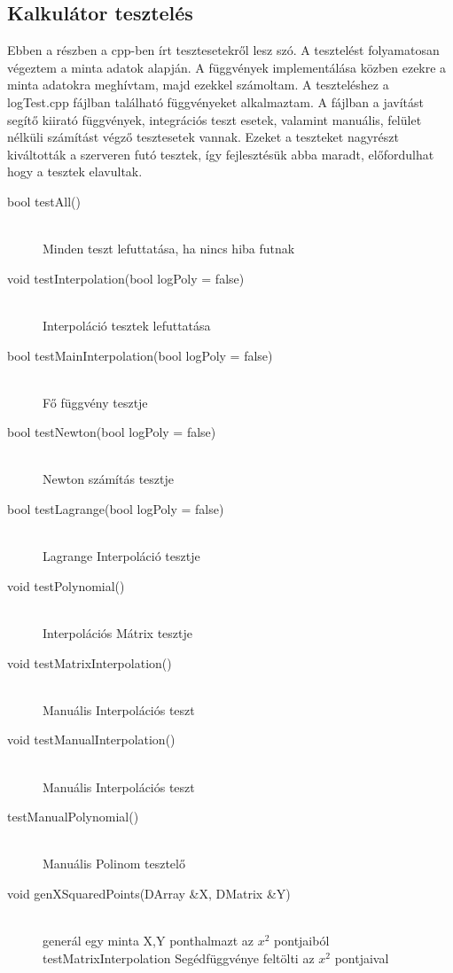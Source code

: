\subsection{Kalkulátor tesztelés}
	Ebben a részben a cpp-ben írt tesztesetekről lesz szó. \newline
	A tesztelést folyamatosan végeztem a minta adatok alapján. A függvények implementálása közben ezekre a minta adatokra meghívtam, majd ezekkel számoltam. A teszteléshez a logTest.cpp fájlban található függvényeket alkalmaztam. \newline
	A fájlban a javítást segítő kiirató függvények, integrációs teszt esetek, valamint manuális, felület nélküli számítást végző tesztesetek vannak. \newline
	Ezeket a teszteket nagyrészt kiváltották a szerveren futó tesztek, így fejlesztésük abba maradt, előfordulhat hogy a tesztek elavultak.
	\begin{description}
		\item[bool testAll()] \hfill \\ 
			Minden teszt lefuttatása, ha nincs hiba futnak
		\item[void testInterpolation(bool logPoly = false)] \hfill \\ 
			Interpoláció tesztek lefuttatása
		\item[bool testMainInterpolation(bool logPoly = false)] \hfill \\ 
			Fő függvény tesztje
		\item[bool testNewton(bool logPoly = false)] \hfill \\ 
			Newton számítás tesztje
		\item[bool testLagrange(bool logPoly = false)] \hfill \\ 
			Lagrange Interpoláció tesztje
		\item[void testPolynomial()] \hfill \\ 
			Interpolációs Mátrix tesztje
		\item[void testMatrixInterpolation()] \hfill \\ 
			Manuális Interpolációs teszt
		\item[void testManualInterpolation()] \hfill \\ 
			Manuális Interpolációs teszt

		\item[testManualPolynomial()] \hfill \\ 
			Manuális Polinom tesztelő 
		\item[void genXSquaredPoints(DArray \&X, DMatrix \&Y)] \hfill \\ 
			generál egy minta X,Y ponthalmazt az $x^{2}$ 
			pontjaiból
		testMatrixInterpolation Segédfüggvénye
		feltölti az $x^{2}$ pontjaival 
	\end{description}
